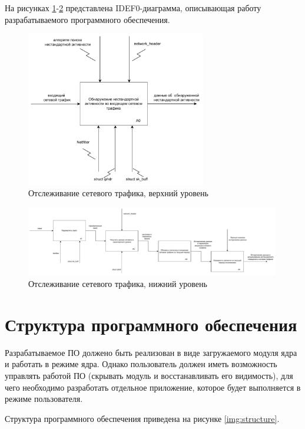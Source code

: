 \documentclass{bmstu}
\begin{document}
На рисунках \ref{img:IDEF00}-\ref{img:IDEF01} представлена IDEF0-диаграмма, описывающая работу разрабатываемого программного обеспечения.

\begin{figure}[hbtp]
 \centering
 \includegraphics[width=0.7\textwidth]{inc/img/idfe00.pdf}
 \caption{Отслеживание сетевого трафика, верхний уровень}
 \label{img:IDEF00}
\end{figure}

\begin{figure}[hbtp]
 \centering
 \includegraphics[width=0.99\textwidth]{inc/img/idfe01.pdf}
 \caption{Отслеживание сетевого трафика, нижний уровень}
 \label{img:IDEF01}
\end{figure}

\newpage
\section{Структура программного обеспечения}
Разрабатываемое ПО должено быть реализован в виде загружаемого модуля ядра и работать в режиме ядра. Однако пользователь должен иметь возможность управлять работой ПО (скрывать модуль и восстанавливать его видимость), для чего необходимо разработать отдельное приложение, которое будет выполняется в режиме пользователя.

Структура программного обеспечения приведена на рисунке \ref{img:structure}.
\end{document}
